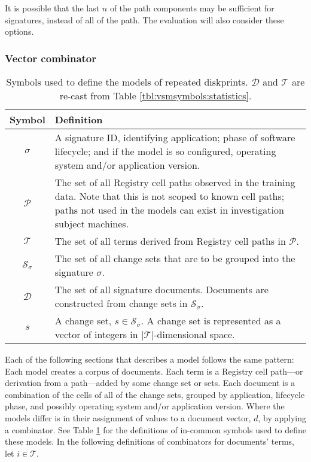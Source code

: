 \documentclass[11pt]{ucthesis}
\theoremstyle{plain}
\theoremstyle{definition}
\begin{document}
It is possible that the last $n$ of the path components may be sufficient for signatures, instead of all of the path.  The evaluation will also consider these options.


\subsubsection{Vector combinator}
\label{sec:combinator}

\begin{table}[htp]
\caption{\label{tbl:repeatedprintmodelsymbols}Symbols used to define the models of repeated diskprints.  $\mathcal{D}$ and $\mathcal{T}$ are re-cast from Table \ref{tbl:vsmsymbols:statistics}.}
\begin{center}
\begin{small}
\begin{tabular}{cp{5in}}
\toprule
Symbol & Definition \\
\midrule
$\sigma$ & A signature ID, identifying application; phase of software lifecycle; and if the model is so configured, operating system and/or application version. \\
$\mathcal{P}$ & The set of all Registry cell paths observed in the training data.  Note that this is not scoped to known cell paths; paths not used in the models can exist in investigation subject machines. \\
$\mathcal{T}$ & The set of all terms derived from Registry cell paths in $\mathcal{P}$. \\
$\mathcal{S}_\sigma$ & The set of all change sets that are to be grouped into the signature $\sigma$. \\
$\mathcal{D}$ & The set of all signature documents.  Documents are constructed from change sets in $\mathcal{S}_\sigma$. \\
$s$ & A change set, $s \in \mathcal{S}_\sigma$.  A change set is represented as a vector of integers in $|\mathcal{T}|$-dimensional space. \\
\bottomrule
\end{tabular}
\end{small}
\end{center}
\end{table}

Each of the following sections that describes a model follows the same pattern:  Each model creates a corpus of documents.  Each term is a Registry cell path---or derivation from a path---added by some change set or sets.  Each document is a combination of the cells of all of the change sets, grouped by application, lifecycle phase, and possibly operating system and/or application version.  Where the models differ is in their assignment of values to a document vector, $d$, by applying a combinator.  See Table \ref{tbl:repeatedprintmodelsymbols} for the definitions of in-common symbols used to define these models.  In the following definitions of combinators for documents' terms, let $i \in \mathcal{T}$.
\end{document}

